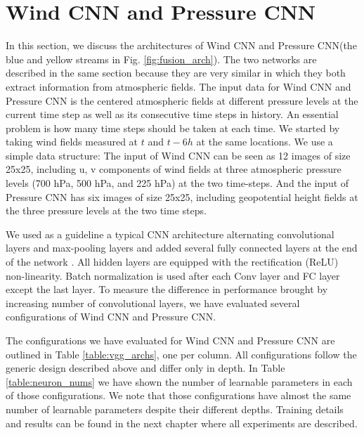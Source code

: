 \section{Wind CNN and Pressure CNN}
In this section, we discuss the architectures of Wind CNN and Pressure CNN(the blue and yellow streams in Fig. \ref{fig:fusion_arch}).
The two networks are described in the same section because they are very similar in which they both extract information from atmospheric fields. The input data for Wind CNN and Pressure CNN is the centered atmospheric fields at different pressure levels at the current time step as well as its consecutive time steps in history. An essential problem is how many time steps should be taken at each time. We started by taking wind fields measured at $t$ and $t - 6h$ at the same locations. We use a simple data structure: The input of Wind CNN can be seen as 12 images of size 25x25, including u, v components of wind fields at three atmospheric pressure levels (700 hPa, 500 hPa, and 225 hPa) at the two time-steps. And the input of Pressure CNN has six images of size 25x25, including geopotential height fields at the three pressure levels at the two time steps.

We used as a guideline a typical CNN architecture alternating convolutional layers and max-pooling layers and added several fully connected layers at the end of the network \cite{simonyan2014very}. All hidden layers are equipped with the rectification (ReLU) non-linearity. Batch normalization is used after each Conv layer and FC layer except the last layer. To measure the difference in performance brought by increasing number of convolutional layers, we have evaluated several configurations of Wind CNN and Pressure CNN. 
  
The configurations we have evaluated for Wind CNN and Pressure CNN are outlined in Table \ref{table:vgg_archs}, one per column. All configurations follow the generic design described above and differ only in depth. In Table \ref{table:neuron_nums} we have shown the number of learnable parameters in each of those configurations. We note that those configurations have almost the same number of learnable parameters despite their different depths. Training details and results can be found in the next chapter where all experiments are described.
 
